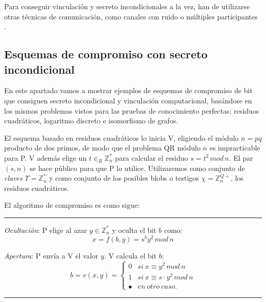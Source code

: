 Para conseguir vinculación y secreto incondicionales a la vez, han de utilizarse otras técnicas de comunicación, como canales con ruido o múltiples participantes \citep{damgardcommitment, crepeau1997efficient, ben1988completeness, chaum1988multiparty, crepeau1988achieving}.



\subsection{Esquemas de compromiso con secreto incondicional}

En este apartado vamos a mostrar ejemplos de esquemas de compromiso de bit que consiguen secreto incondicional y vinculación computacional, basándose en los mismos problemas vistos para las pruebas de conocimiento perfectas: residuos cuadráticos, logaritmo discreto e isomorfismo de grafos.

\hfil

El esquema basado en residuos cuadráticos lo inicia V, eligiendo el módulo $n=pq$ producto de dos primos, de modo que el problema QR módulo $n$ es impracticable para P. V además elige un $t\in_R \mathbb{Z}_n^*$ para calcular el residuo $s=t^2\,mod\,n$. El par $(s,n)$ se hace público para que P lo utilice. Utilizaremos como conjunto de \textit{claves} $\Upsilon = \mathbb{Z}_n^*$ y como conjunto de los posibles blobs o testigos $\chi = \mathbb{Z}_n^{Q+}$, los residuos cuadráticos.

El algoritmo de compromiso es como sigue:



\hfil

\rule{\textwidth}{1pt}
\begin{algorithm}\label{commitQRsec:alg}
	\hfil
	
	\textit{Ocultación}: P elige al azar $y\in \mathbb{Z}_n^*$ y oculta el bit $b$ como:
	\[x = f(b,y) = s^b y^2 \, mod \, n \]
	
	\textit{Apertura}: P envía a V el valor $y$. V calcula el bit $b$:
	\[ b = v(x,y) = 
	\begin{cases}
	0  & si\ x\equiv y^2 \, mod \, n  \\
	1 & si\ x\equiv s\cdot y^2 \, mod \, n\\
	\bullet & en\ otro\ caso.
	\end{cases}
	\]
	\label{bitcommitQR:alg}
\end{algorithm}
\rule{\textwidth}{1pt}

\hfil


